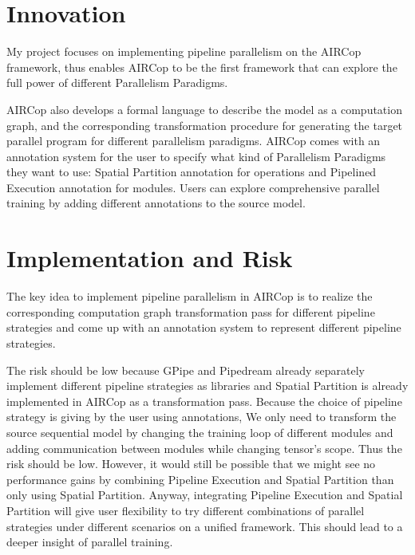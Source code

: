 \documentclass[sigplan,nonacm]{acmart}
\begin{document}
\section{Innovation}
My project focuses on implementing pipeline parallelism on the AIRCop framework, thus enables AIRCop to be the first framework that can explore the full power of different Parallelism Paradigms. \par 
 AIRCop also develops a formal language to describe the model as a computation graph, and the corresponding transformation procedure for generating the target parallel program for different parallelism paradigms. AIRCop comes with an annotation system for the user to specify what kind of Parallelism Paradigms they want to use: Spatial Partition annotation for operations and Pipelined Execution annotation for modules. Users can explore comprehensive parallel training by adding different annotations to the source model.
 \section{Implementation and Risk}
 The key idea to implement pipeline parallelism in AIRCop is to realize the corresponding computation graph transformation pass for different pipeline strategies and come up with an annotation system to represent different pipeline strategies.\par
 The risk should be low because GPipe and Pipedream already separately implement different pipeline strategies as libraries and Spatial Partition is already implemented in AIRCop as a transformation pass. Because the choice of pipeline strategy is giving by the user using annotations, We only need to transform the source sequential model by changing the training loop of different modules and adding communication between modules while changing tensor's scope. Thus the risk should be low. However, it would still be possible that we might see no performance gains by combining Pipeline Execution and Spatial Partition than only using Spatial Partition. Anyway, integrating Pipeline Execution and Spatial Partition will give user flexibility to try different combinations of parallel strategies under different scenarios on a unified framework. This should lead to a deeper insight of parallel training.
\end{document}
